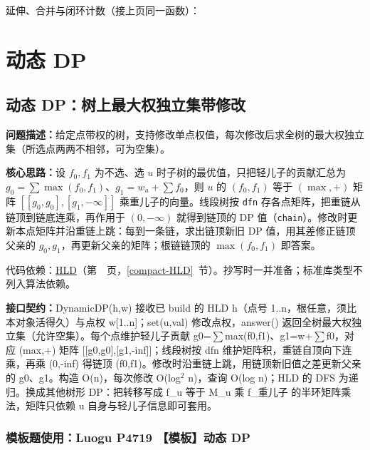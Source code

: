 \newpage

延伸、合并与闭环计数（接上页同一函数）：



\Needspace{180pt}

\chapter{动态 DP}

\section{动态 DP：树上最大权独立集带修改}\label{compact-DynamicDP}

\noindent\textbf{问题描述：}\allowbreak 给定点带权的树，支持修改单点权值，每次修改后求全树的最大权独立集（所选点两两不相邻，可为空集）。

\textbf{核心思路：}\allowbreak 设 $f_0,f_1$ 为不选、选 $u$ 时子树的最优值，只把轻儿子的贡献汇总为 $g_0=\sum\max(f_0,f_1)$、$g_1=w_u+\sum f_0$，则 $u$ 的 $(f_0,f_1)$ 等于 $(\max,+)$ 矩阵 $[[g_0,g_0],[g_1,-\infty]]$ 乘重儿子的向量。线段树按 \texttt{dfn} 存各点矩阵，把重链从链顶到链底连乘，再作用于 $(0,-\infty)$ 就得到链顶的 DP 值（\texttt{chain}）。修改时更新本点矩阵并沿重链上跳：每到一条链，求出链顶新旧 DP 值，用其差修正链顶父亲的 $g_0,g_1$，再更新父亲的矩阵；根链链顶的 $\max(f_0,f_1)$ 即答案。

代码依赖：\hyperref[compact-HLD]{HLD}（第~\pageref{compact-HLD}~页，\ref{compact-HLD}~节）。抄写时一并准备；标准库类型不列入算法依赖。

{\sloppy{}\noindent\textbf{接口契约：}DynamicDP(h,w) 接收已 build 的 HLD h（点号 1..n，根任意，须比本对象活得久）与点权 w[1..n]；set(u,val) 修改点权，answer() 返回全树最大权独立集（允许空集）。每个点维护轻儿子贡献 g0=$\sum$max(f0,f1)、g1=w+$\sum$f0，对应 (max,+) 矩阵 [[g0,g0],[g1,-inf]]；线段树按 dfn 维护矩阵积，重链自顶向下连乘，再乘 (0,-inf) 得链顶 (f0,f1)。修改时沿重链上跳，用链顶新旧值之差更新父亲的 g0、g1。构造 O(n)，每次修改 O(log$^{2}$ n)，查询 O(log n)；HLD 的 DFS 为递归。换成其他树形 DP：把转移写成 f\_u 等于 M\_u 乘 f\_重儿子 的半环矩阵乘法，矩阵只依赖 u 自身与轻儿子信息即可套用。\par}



\Needspace{431pt}

\subsection*{模板题使用：Luogu P4719 【模板】动态 DP}

